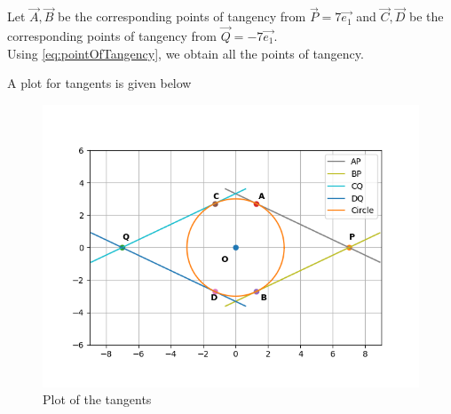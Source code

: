 \documentclass[journal,12pt,twocolumn]{IEEEtran}
\newtheorem{lemma}{Lemma}
\begin{document}
Let $\vec{A}, \vec{B}$ be the corresponding points of tangency from $\vec{P}=7\vec{e_1}$ and 
$\vec{C}, \vec{D}$ be the corresponding points of tangency from $\vec{Q}=-7\vec{e_1}$.\\
Using \eqref{eq:pointOfTangency}, we obtain all the points of tangency.

A plot for tangents is given below
\begin{figure}[!ht]
    \centering
    \includegraphics[width=\columnwidth]{plot/figure}
    \caption{Plot of the tangents}
    \label{plot}
\end{figure}
\end{document}
